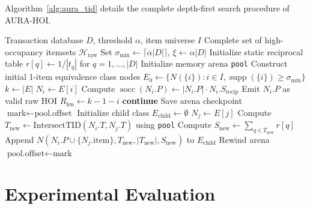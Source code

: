 \documentclass[runningheads,orivec]{llncs}
\newcommand{\supp}{\operatorname{supp}}
\newcommand{\socc}{\operatorname{socc}}
\newcommand{\Hraw}{\mathcal{H}_{\mathrm{raw}}}
\newcommand{\AURA}{\textsc{AURA-HOI}}
\begin{document}
Algorithm~\ref{alg:aura_tid} details the complete depth-first search procedure of \AURA.

\begin{algorithm}[!htbp]
\caption{\AURA{} Search via TID-List Equivalence Classes}
\label{alg:aura_tid}
\begin{algorithmic}[1]
\Require Transaction database $D$, threshold $\alpha$, item universe $I$
\Ensure Complete set of high-occupancy itemsets $\Hraw$
\State Set $\sigma_{\min} \gets \lceil \alpha |D| \rceil$, $\xi \gets \alpha |D|$
\State Initialize static reciprocal table $r[q] \gets 1/|t_q|$ for $q = 1, \dots, |D|$
\State Initialize memory arena \texttt{pool}
\State Construct initial 1-item equivalence class nodes $E_0 \gets \{N(\{i\}) : i \in I, \supp(\{i\}) \ge \sigma_{\min}\}$
  \State $k \gets |E|$
    \State $N_i \gets E[i]$
    \State Compute $\socc(N_i.P) \gets |N_i.P| \cdot N_i.S_{\mathrm{recip}}$
    \If{$\socc(N_i.P) \ge \xi$}
      \State Emit $N_i.P$ as valid raw HOI
    \EndIf
    \State $R_{\mathrm{len}} \gets k - 1 - i$ 
      \State \textbf{continue} 
    \EndIf
    \State Save arena checkpoint $\text{mark} \gets \text{pool.offset}$
    \State Initialize child class $E_{\mathrm{child}} \gets \emptyset$
      \State $N_j \gets E[j]$
      \State Compute $T_{\mathrm{new}} \gets \text{IntersectTID}(N_i.T, N_j.T)$ using \texttt{pool}
        \State Compute $S_{\mathrm{new}} \gets \sum_{q \in T_{\mathrm{new}}} r[q]$
        \State Append $N(N_i.P \cup \{N_j.\text{item}\}, T_{\mathrm{new}}, |T_{\mathrm{new}}|, S_{\mathrm{new}})$ to $E_{\mathrm{child}}$
      \EndIf
    \EndFor
      \State {}
    \EndIf
    \State Rewind arena $\text{pool.offset} \gets \text{mark}$
  \EndFor
\EndProcedure
\State {}
\end{algorithmic}
\end{algorithm}

\section{Experimental Evaluation}
\end{document}
